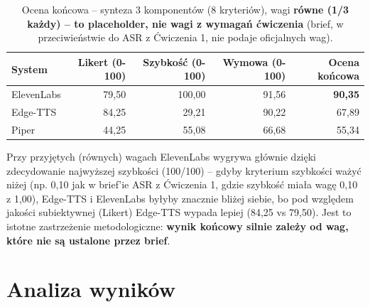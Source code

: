 \documentclass{article}
\begin{document}
\begin{table}[h]
\centering
\begin{tabular}{lrrrr}
\toprule
System & Likert (0-100) & Szybkość (0-100) & Wymowa (0-100) & \textbf{Ocena końcowa} \\
\midrule
ElevenLabs & 79,50 & 100,00 & 91,56 & \textbf{90,35} \\
Edge-TTS   & 84,25 & 29,21  & 90,22 & 67,89 \\
Piper      & 44,25 & 55,08  & 66,68 & 55,34 \\
\bottomrule
\end{tabular}
\caption{Ocena końcowa -- synteza 3 komponentów (8 kryteriów), wagi \textbf{równe (1/3 każdy)
-- to placeholder, nie wagi z wymagań ćwiczenia} (brief, w przeciwieństwie do ASR z Ćwiczenia
1, nie podaje oficjalnych wag).}
\end{table}

Przy przyjętych (równych) wagach ElevenLabs wygrywa głównie dzięki zdecydowanie najwyższej
szybkości (100/100) -- gdyby kryterium szybkości ważyć niżej (np. 0,10 jak w brief'ie ASR z
Ćwiczenia 1, gdzie szybkość miała wagę 0,10 z 1,00), Edge-TTS i ElevenLabs byłyby znacznie
bliżej siebie, bo pod względem jakości subiektywnej (Likert) Edge-TTS wypada lepiej (84,25 vs
79,50). Jest to istotne zastrzeżenie metodologiczne: \textbf{wynik końcowy silnie zależy od
wag, które nie są ustalone przez brief}.

\section{Analiza wyników}
\end{document}
